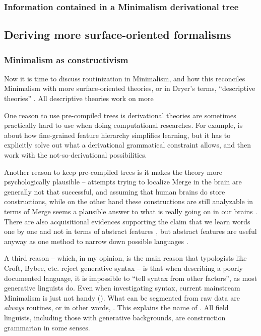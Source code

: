 \documentclass[../main.tex]{subfiles}
\begin{document}
\subsubsection{Information contained in a Minimalism derivational tree}


\subsection{Deriving more surface-oriented formalisms}

\subsubsection{Minimalism as constructivism}\label{sec:routine}

Now it is time to discuss routinization in Minimalism, 
and how this reconciles Minimalism with more surface-oriented theories, 
or in Dryer's terms, ``descriptive theories'' \citep{dryer2006descriptive}.
All descriptive theories work on more %

One reason to use pre-compiled trees is derivational theories are sometimes 
practically hard to use when doing computational researches. For example, \citet{liter2020modeling}
is about how fine-grained feature hierarchy simplifies learning, but it has to explicitly solve out what 
a derivational grammatical constraint allows, and then work with the not-so-derivational possibilities.

Another reason to keep pre-compiled trees is it makes the theory more psychologically plausible --
attempts trying to localize Merge in the brain are generally not that successful, and assuming that 
human brains do store constructions, while on the other hand these constructions are still analyzable 
in terms of Merge seems a plausible answer to what is really going on in our brains
\citep{brain-syntax-1,brain-syntax-2}. There are also acquisitional evidences supporting the claim 
that we learn words one by one and not in terms of abstract features \citep{white2022lexicalization},
but abstract features are useful anyway as one method to narrow down possible languages \citep{liter2020modeling}.

A third reason -- which, in my opinion, is the main reason that 
typologists like Croft, Bybee, etc. reject generative syntax -- 
is that when describing a poorly documented language, 
it is impossible to ``tell syntax from other factors'', 
as most generative linguists do.
Even when investigating syntax,
current mainstream Minimalism is just not handy ().
What can be segmented from raw data are \emph{always} routines,
or in other words, .
This explains the name of \citet{croft2001radical}.
All field linguists, including those with generative backgrounds,
are construction grammarian in some senses.
\end{document}
